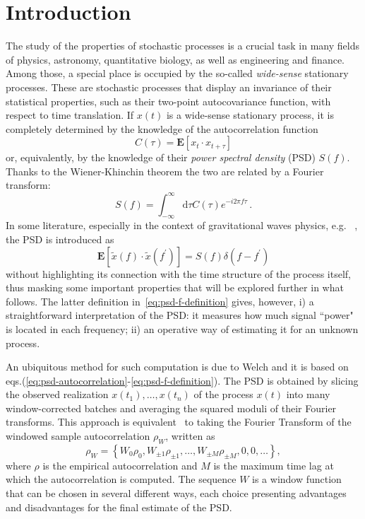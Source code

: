 \documentclass[twocolumn,showpacs,preprintnumbers,nofootinbib,prd,
superscriptaddress,10pt]{revtex4-1}
\begin{document}
\section{Introduction}

The study of the properties of stochastic processes is a crucial task in many fields of physics, astronomy, quantitative biology, as well as engineering and finance. Among those, a special place is occupied by the so-called \textit{wide-sense} stationary processes. These are stochastic processes that display an invariance of their statistical properties, such as their two-point autocovariance function, with respect to time translation. If $x(t)$ is a wide-sense stationary process, it is completely determined by the knowledge of the autocorrelation function 
\begin{equation}
	C(\tau) = \mathbf{E}[x_t \cdot x_{t+\tau}]
\end{equation}
or, equivalently, by the knowledge of their \emph{power spectral density} (PSD) $S(f)$. Thanks to the Wiener-Khinchin theorem the two are related by a Fourier transform: 
\begin{equation}\label{eq:psd-autocorrelation}
	S(f) = \int_{-\infty}^{\infty} \textrm{d}\tau C(\tau) e^{-i 2 \pi f \tau}\,.
\end{equation}
In some literature, especially in the context of gravitational waves physics, e.g. ~\cite{Finn_1992}, the PSD is introduced as  
\begin{equation}\label{eq:psd-f-definition}
	\mathbf{E}[\tilde{x}(f) \cdot \tilde{x}(f^\prime)] = S(f) \delta(f-f^\prime)
\end{equation}
without highlighting its connection with the time structure of the process itself, thus masking some important properties that will be explored further in what follows. The latter definition in~\eqref{eq:psd-f-definition} gives, however, i) a straightforward interpretation of the PSD: it measures how much signal ``power" is located in each frequency; ii) an operative way of estimating it for an unknown process.  

An ubiquitous method for such computation is due to Welch \cite{Welch1967} and it is based on eqs.(\ref{eq:psd-autocorrelation}-\ref{eq:psd-f-definition}).
The PSD is obtained by slicing the observed realization $x(t_1),\ldots,x(t_n)$ of the process $x(t)$ into many window-corrected batches and averaging the squared moduli of their Fourier transforms.
This approach is equivalent~\cite{Lomb,Scargle} to taking the Fourier Transform of the windowed sample autocorrelation $\rho_W$, written as
\begin{equation}
    \rho_{W} = \left\{W_0\rho_0,W_{\pm 1}\rho_{\pm 1}, \dots, W_{\pm M}\rho_{\pm M}, 0, 0, \dots \right\},
\end{equation}
where $\rho$ is the empirical autocorrelation and $M$ is the maximum time lag at which the autocorrelation is computed.
The sequence $W$ is a window function that can be chosen in several different ways, each choice presenting advantages and disadvantages for the final estimate of the PSD.
\end{document}
